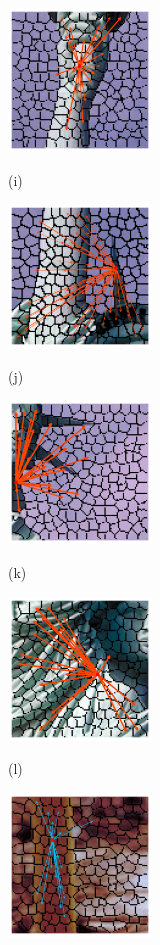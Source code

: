 \begin{figure}[]
\begin{minipage}[t]{.24\linewidth}
		\includegraphics[width=1.5in]{cropped/lady_superpixel_1.jpg}
		\centerline{(i)}
	\end{minipage}
	\begin{minipage}[t]{.24\linewidth}
		\includegraphics[width=1.5in]{cropped/lady_superpixel_5.jpg}
		\centerline{(j)}
	\end{minipage}
	\begin{minipage}[t]{.24\linewidth}
		\includegraphics[width=1.5in]{cropped/lady_superpixel_10.jpg}
		\centerline{(k)}
	\end{minipage}
	\begin{minipage}[t]{.24\linewidth}
		\includegraphics[width=1.5in]{cropped/lady_superpixel_9.jpg}
		\centerline{(l)}
	\end{minipage}
	\begin{minipage}[t]{.24\linewidth}
		\includegraphics[width=1.5in]{cropped/shroom_superpixel_9.jpg}

\end{minipage}
\end{figure}
